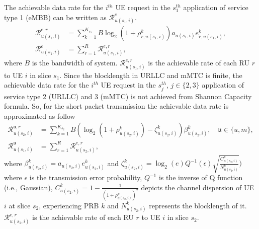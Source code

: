 \documentclass{article}
\begin{document}
The achievable data rate for the $i^{th}$ UE request in the $s_{1}^{th}$ application of service type 1 (eMBB) can be written as $\mathcal{R}_{u(s_1,i)}^{e}$.
\begin{equation}\label{eq1}
\begin{split}
\mathcal{R}_{u(s_1,i)}^{e,r} &= \sum_{k=1}^{K_{s_1}} B \log_2({1+ \rho_{r,u(s_1,i)}^{k}})a_{u(s_1,i)} e^k_{r,u(s_1,i)},\\
\mathcal{R}_{u(s_1,i)}^{e} &= \sum_{r=1}^{R}\mathcal{R}_{u(s_1,i)}^{e,r},
\end{split}
\end{equation}
where $B$ is the bandwidth of system. 
$\mathcal{R}_{u(s_1,i)}^{e,r}$ is the achievable rate of each RU $r$ to UE $i$ in slice $s_1$.
Since the blocklength in URLLC and mMTC is finite, the achievable data rate for the $i^{th}$ UE request in the $s_{j}^{th} $, $j \in \{2,3\}$ application of service type 2 (URLLC) and 3 (mMTC) is not achieved from Shannon Capacity formula. So, for the short packet transmission the achievable data rate is approximated as follow
\begin{equation}\label{eq11}
\begin{split}
\mathcal{R}_{u(s_2,i)}^{\mathfrak{u},r} &= \sum_{k=1}^{K_{s_2}} B (\log_2({1+ \rho_{u(s_2,i)}^{k}})- \zeta_{u(s_2,i)}^{k}){\beta}_{u(s_2,i)}^{k}, \quad \mathfrak{u} \in  \{u,m\}, \\
\mathcal{R}_{u(s_1,i)}^{\mathfrak{u}} &= \sum_{r=1}^{R}\mathcal{R}_{u(s_2,i)}^{e,r}, 
\end{split}
\end{equation}
where ${\beta}_{u(s_2,i)}^{k}=a_{u(s_2,i)} e^{k}_{u(s_2,i)}$
and $\zeta_{u(s_2,i)}^{k} = \log_2({e})Q^{-1}(\epsilon) \sqrt{\frac{C_{u(s_2,i)}^{k}}{N_{u(s_2,i)}^{k}}})$
where $\epsilon$ is the transmission error probability, $Q^{-1}$ is the inverse of Q function (i.e., Gaussian),
$C_{u(s_2,i)}^{k} = 1 - \frac{1}{(1+\rho_{u(s_2,i)}^{k})^2}$ depicts the channel dispersion of UE  $i$ at slice $s_2$, experiencing PRB $k$ and
$N_{u(s_2,i)}^{k}$ represents the blocklength of it. 
$\mathcal{R}_{u(s_1,i)}^{e,r}$ is the achievable rate of each RU $r$ to UE $i$ in slice $s_2$.
\end{document}
